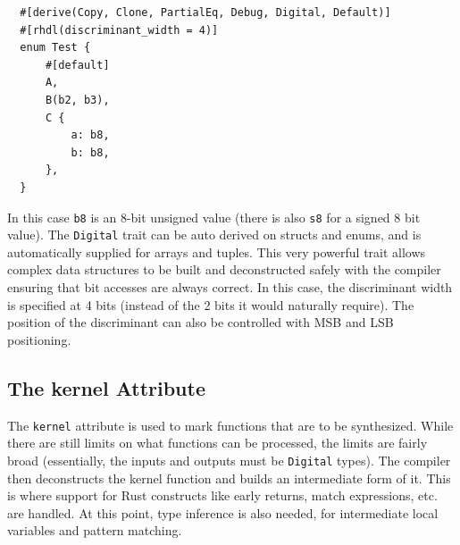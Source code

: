 \documentclass[conference]{IEEEtran}
\begin{document}
\begin{verbatim}
  #[derive(Copy, Clone, PartialEq, Debug, Digital, Default)]
  #[rhdl(discriminant_width = 4)]
  enum Test {
      #[default]
      A,
      B(b2, b3),
      C {
          a: b8,
          b: b8,
      },
  }
\end{verbatim}

In this case \verb|b8| is an 8-bit unsigned value (there is also \verb|s8| for a signed 8 bit value).  The \verb|Digital| trait can be
auto derived on structs and enums, and is automatically supplied for arrays and tuples.  This very powerful trait allows 
complex data structures to be built and deconstructed safely with the compiler ensuring that bit accesses are always correct.
In this case, the discriminant width is specified at 4 bits (instead of the 2 bits it would naturally require).  The position 
of the discriminant can also be controlled with MSB and LSB positioning. 

\subsection{The \textrm{kernel} Attribute}
The \verb|kernel| attribute is used to mark functions that are to be synthesized.  While there are still limits on what 
functions can be processed, the limits are fairly broad (essentially, the inputs and outputs must be \verb|Digital| types). 
The compiler then deconstructs the kernel function and builds an intermediate form of it.  This is where support for
Rust constructs like early returns, match expressions, etc. are handled.   At this point, type inference is also needed, 
for intermediate local variables and pattern matching.  
\end{document}
